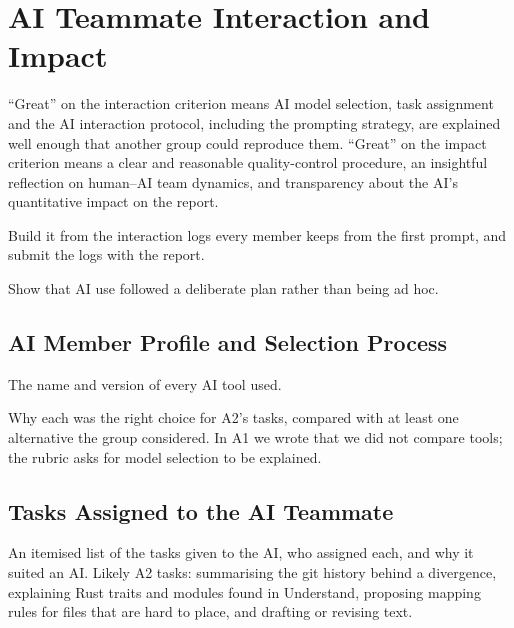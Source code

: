 \section{AI Teammate Interaction and Impact}
\label{sec:ai-report}


\begin{requirements}
  \item ``Great'' on the interaction criterion means AI model selection, task assignment and the AI interaction protocol, including the prompting strategy, are explained well enough that another group could reproduce them. ``Great'' on the impact criterion means a clear and reasonable quality-control procedure, an insightful reflection on human--AI team dynamics, and transparency about the AI's quantitative impact on the report.
  \item Build it from the interaction logs every member keeps from the first prompt, and submit the logs with the report.
  \item Show that AI use followed a deliberate plan rather than being ad hoc.
\end{requirements}

\subsection{AI Member Profile and Selection Process}
\label{sec:ai-profile}

\begin{requirements}
  \item The name and version of every AI tool used.
  \item Why each was the right choice for A2's tasks, compared with at least one alternative the group considered. In A1 we wrote that we did not compare tools; the rubric asks for model selection to be explained.
\end{requirements}

\subsection{Tasks Assigned to the AI Teammate}
\label{sec:ai-tasks}

\begin{requirements}
  \item An itemised list of the tasks given to the AI, who assigned each, and why it suited an AI. Likely A2 tasks: summarising the git history behind a divergence, explaining Rust traits and modules found in Understand, proposing mapping rules for files that are hard to place, and drafting or revising text.
\end{requirements}

